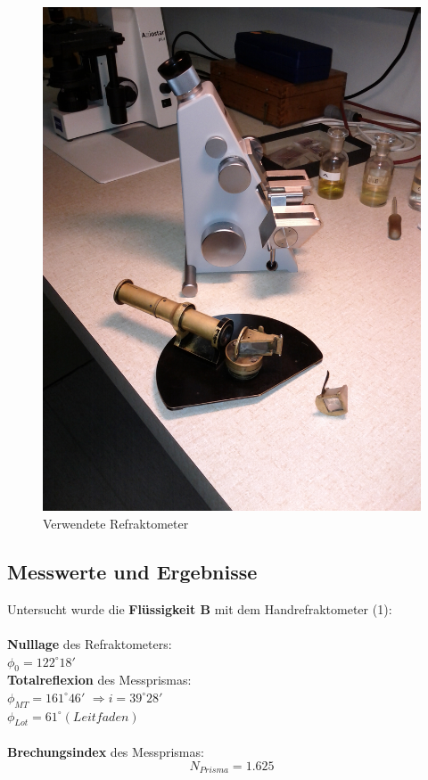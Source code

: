 \documentclass[12pt,a4paper]{article}
\begin{document}
\begin{multicols}{2}
\begin{figure}[H]
	\centering
	\includegraphics[angle=-90,scale=0.11]{./figure/refrakto.jpg}
	\caption{Verwendete Refraktometer}
	\label{fig:geraete_refrakto}
\end{figure}



\subsection{Messwerte und Ergebnisse}
Untersucht wurde die \textbf{Flüssigkeit B} mit dem Handrefraktometer (1): \\
\\
\textbf{Nulllage} des Refraktometers:\\
\indent $\phi_0 = 122^\circ 18'$\\
\textbf{Totalreflexion} des Messprismas:\\
\indent $\phi_{MT} = 161^\circ 46'$
\indent $\Rightarrow i=39^\circ 28' $\\
\indent $\phi_{Lot} = 61^\circ (Leitfaden)$\\
\\
\textbf{Brechungsindex} des Messprismas:
$$N_{Prisma} = 1.625$$%
\\


\end{multicols}
\end{document}
